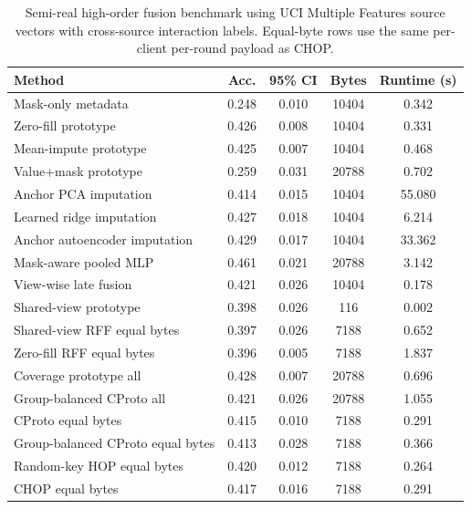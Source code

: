\begin{table}[t]
\centering
\caption{Semi-real high-order fusion benchmark using UCI Multiple Features source vectors with cross-source interaction labels. Equal-byte rows use the same per-client per-round payload as CHOP.}
\label{tab:if-mfeat-interaction}
\scriptsize
\setlength{\tabcolsep}{3pt}
\renewcommand{\arraystretch}{0.94}
\begin{tabular}{lcccc}
\toprule
Method & Acc. & 95\% CI & Bytes & Runtime (s) \\
\midrule
Mask-only metadata & 0.248 & 0.010 & 10404 & 0.342 \\
Zero-fill prototype & 0.426 & 0.008 & 10404 & 0.331 \\
Mean-impute prototype & 0.425 & 0.007 & 10404 & 0.468 \\
Value+mask prototype & 0.259 & 0.031 & 20788 & 0.702 \\
Anchor PCA imputation & 0.414 & 0.015 & 10404 & 55.080 \\
Learned ridge imputation & 0.427 & 0.018 & 10404 & 6.214 \\
Anchor autoencoder imputation & 0.429 & 0.017 & 10404 & 33.362 \\
Mask-aware pooled MLP & 0.461 & 0.021 & 20788 & 3.142 \\
View-wise late fusion & 0.421 & 0.026 & 10404 & 0.178 \\
Shared-view prototype & 0.398 & 0.026 & 116 & 0.002 \\
Shared-view RFF equal bytes & 0.397 & 0.026 & 7188 & 0.652 \\
Zero-fill RFF equal bytes & 0.396 & 0.005 & 7188 & 1.837 \\
Coverage prototype all & 0.428 & 0.007 & 20788 & 0.696 \\
Group-balanced CProto all & 0.421 & 0.026 & 20788 & 1.055 \\
CProto equal bytes & 0.415 & 0.010 & 7188 & 0.291 \\
Group-balanced CProto equal bytes & 0.413 & 0.028 & 7188 & 0.366 \\
Random-key HOP equal bytes & 0.420 & 0.012 & 7188 & 0.264 \\
CHOP equal bytes & 0.417 & 0.016 & 7188 & 0.291 \\
\bottomrule
\end{tabular}
\end{table}
